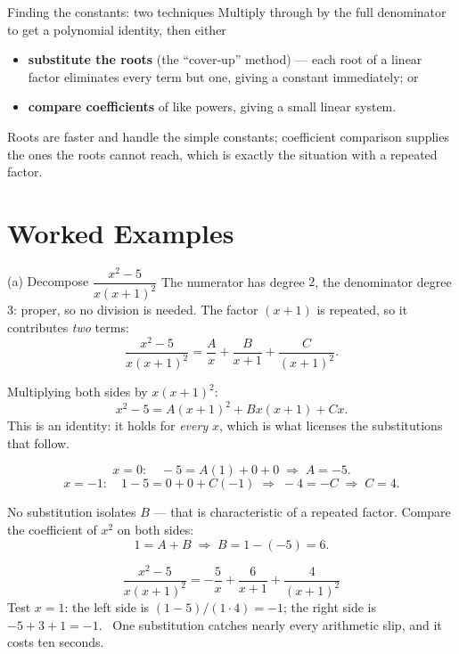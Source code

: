 \begin{rulebox}{Finding the constants: two techniques}
Multiply through by the full denominator to get a polynomial identity, then
either
\begin{itemize}[leftmargin=1.6em,itemsep=0.3ex]
  \item \textbf{substitute the roots} (the ``cover-up'' method) --- each root
        of a linear factor eliminates every term but one, giving a constant
        immediately; or
  \item \textbf{compare coefficients} of like powers, giving a small linear
        system.
\end{itemize}
Roots are faster and handle the simple constants; coefficient comparison
supplies the ones the roots cannot reach, which is exactly the situation with
a repeated factor.
\end{rulebox}

\section{Worked Examples}

\begin{worked}{(a) Decompose $\dfrac{x^{2}-5}{x(x+1)^{2}}$}
The numerator has degree $2$, the denominator degree $3$: proper, so no
division is needed. The factor $(x+1)$ is repeated, so it contributes
\emph{two} terms:
\[
  \frac{x^{2}-5}{x(x+1)^{2}}
  =\frac{A}{x}+\frac{B}{x+1}+\frac{C}{(x+1)^{2}} .
\]

Multiplying both sides by $x(x+1)^{2}$:
\[
  x^{2}-5=A(x+1)^{2}+Bx(x+1)+Cx .
\]
This is an identity: it holds for \emph{every} $x$, which is what licenses
the substitutions that follow.

\[
  x=0:\quad -5=A(1)+0+0 \;\Longrightarrow\; A=-5 .
\]
\[
  x=-1:\quad 1-5=0+0+C(-1) \;\Longrightarrow\; -4=-C \;\Longrightarrow\; C=4 .
\]

No substitution isolates $B$ --- that is characteristic of a repeated
factor. Compare the coefficient of $x^{2}$ on both sides:
\[
  1=A+B \;\Longrightarrow\; B=1-(-5)=6 .
\]

\[
  \frac{x^{2}-5}{x(x+1)^{2}}=\boxed{-\frac{5}{x}+\frac{6}{x+1}+\frac{4}{(x+1)^{2}}}
\]
Test $x=1$: the left side is $(1-5)/(1\cdot4)=-1$; the right side is
$-5+3+1=-1$. \checkmark\ One substitution catches nearly every arithmetic
slip, and it costs ten seconds.
\end{worked}

